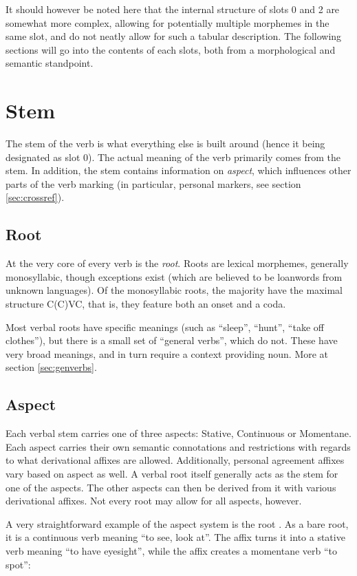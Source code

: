 \documentclass[paper=6in:9in, fontsize=10.5]{scrbook}
\newcommand{\en}[1]{``#1''}
\newcommand{\mes}[1]{\hspace{0pt}{\color{teal}#1}}
\newcommand{\ý}{ɨ́}
\begin{document}
It should however be noted here that the internal structure of slots 0 and 2 are somewhat more complex, allowing for potentially multiple morphemes in the same slot, and do not neatly allow for such a tabular description. The following sections will go into the contents of each slots, both from a morphological and semantic standpoint.

\section{Stem}
The stem of the verb is what everything else is built around (hence it being designated as slot 0). The actual meaning of the verb primarily comes from the stem. In addition, the stem contains information on \emph{aspect}, which influences other parts of the verb marking (in particular, personal markers, see section \ref{sec:crossref}).
 
\subsection{Root}
At the very core of every verb is the \emph{root}. Roots are lexical morphemes, generally monosyllabic, though exceptions exist (which are believed to be loanwords from unknown languages). Of the monosyllabic roots, the majority have the maximal structure C(C)VC, that is, they feature both an onset and a coda. 

Most verbal roots have specific meanings (such as \en{sleep}, \en{hunt}, \en{take off clothes}), but there is a small set of “general verbs”, which do not. These have very broad meanings, and in turn require a context providing noun. More at section \ref{sec:genverbs}.

\subsection{Aspect} \label{ssec:aspect}
Each verbal stem carries one of three aspects: Stative, Continuous or Momentane. Each aspect carries their own semantic connotations and restrictions with regards to what derivational affixes are allowed. Additionally, personal agreement affixes vary based on aspect as well. A verbal root itself generally acts as the stem for one of the aspects. The other aspects can then be derived from it with various derivational affixes. Not every root may allow for all aspects, however.

A very straightforward example of the aspect system is the root \mes{tir}. As a bare root, it is a continuous verb meaning \en{to see, look at}. The affix \mes{-he} turns it into a stative verb meaning \en{to have eyesight}, while the affix \mes{-da} creates a momentane verb \en{to spot}:
\end{document}
